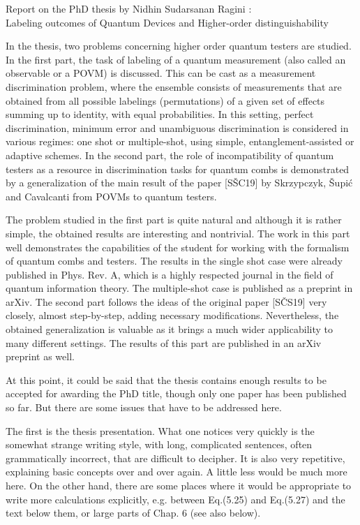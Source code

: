 \documentclass[12pt]{article}
\begin{document}
\begin{center}
{\large Report on the PhD thesis by Nidhin Sudarsanan Ragini
: \\  Labeling outcomes of Quantum Devices and Higher-order distinguishability     
 }

\end{center}
\medskip

\bigskip

\bigskip

In the thesis, two problems concerning higher order quantum testers are studied. In the
first part, the task of labeling of a quantum measurement (also called an observable or a  POVM) is discussed. This can be
cast as a measurement discrimination problem, where the ensemble consists of measurements that
are obtained from all possible labelings (permutations) of a given set of effects summing up to identity, with equal
probabilities. In this setting, perfect discrimination, minimum error and unambiguous
discrimination is considered in various regimes: one shot or multiple-shot, using simple,
entanglement-assisted or adaptive schemes. In the second part, the role of incompatibility
of quantum testers as a resource in discrimination tasks for quantum combs is demonstrated
by a generalization of the main result of the paper
[S\v SC19] by Skrzypczyk, \v Supi\'c and Cavalcanti from POVMs to quantum testers. 

The problem studied in the first part is quite natural and although it is rather simple,
the obtained results are interesting and nontrivial. The work in this part well
demonstrates the capabilities of the student for working with the formalism of quantum combs and testers. 
The results in the single
shot case were already published  in Phys. Rev. A, which is a highly respected journal in
the field of quantum information theory. The multiple-shot case is published as a preprint in
arXiv. The second part follows the ideas of the original paper [S\v CS19] very closely,
almost step-by-step, adding necessary modifications. Nevertheless, the obtained
generalization is valuable as it brings a much wider applicability to many different
settings. The results of this part are published in an arXiv preprint as well. 

At this point, it could be said that the thesis contains enough results to be accepted for
awarding the PhD title, though only one paper has been  published so far. But there are
some issues that have to be addressed here. 


The first is the thesis presentation. What one
notices very quickly is the somewhat strange writing style, with long, complicated sentences,
often grammatically incorrect, that are difficult to decipher. It is also very repetitive,
explaining basic concepts over and over again. A little less would be much more here. On
the other hand, there are some places where it would be
appropriate to write more  calculations explicitly, e.g. between Eq.(5.25) and Eq.(5.27)
and the text below them, or large parts of Chap. 6 (see also below).
\end{document}
